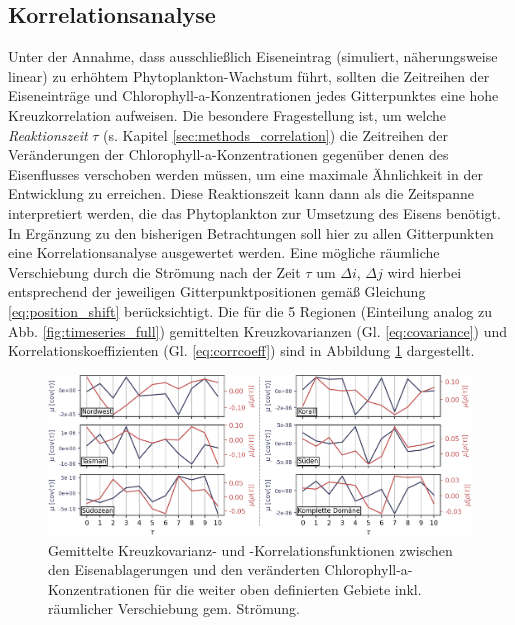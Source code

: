 \documentclass[12pt,a4paper,onecolumn]{scrartcl}
\begin{document}
\subsection{Korrelationsanalyse} \label{sec:correlation_analysis}
Unter der Annahme, dass ausschließlich Eiseneintrag (simuliert, näherungsweise linear) zu erhöhtem Phytoplankton-Wachstum führt, sollten die Zeitreihen der Eiseneinträge und Chlorophyll-a-Konzentrationen jedes Gitterpunktes eine hohe Kreuzkorrelation aufweisen. Die besondere Fragestellung ist, um welche \textit{Reaktionszeit} $\tau$ (s. Kapitel \ref{sec:methods_correlation}) die Zeitreihen der Veränderungen der Chlorophyll-a-Konzentrationen gegenüber denen des Eisenflusses verschoben werden müssen, um eine maximale Ähnlichkeit in der Entwicklung zu erreichen. Diese Reaktionszeit kann dann als die Zeitspanne interpretiert werden, die das Phytoplankton zur Umsetzung des Eisens benötigt. In Ergänzung zu den bisherigen Betrachtungen soll hier zu allen Gitterpunkten eine Korrelationsanalyse ausgewertet werden. Eine mögliche räumliche Verschiebung durch die Strömung nach der Zeit $\tau$ um $\Delta i$, $\Delta j$ wird hierbei entsprechend der jeweiligen Gitterpunktpositionen gemäß Gleichung \ref{eq:position_shift} berücksichtigt. Die für die 5 Regionen (Einteilung analog zu Abb. \ref{fig:timeseries_full}) gemittelten Kreuzkovarianzen (Gl. \ref{eq:covariance}) und Korrelationskoeffizienten (Gl. \ref{eq:corrcoeff}) sind in Abbildung \ref{fig:section_cross_corr} dargestellt.
\begin{figure}[!htb]
\includegraphics[width=\textwidth]{bilder/section_crosscorr_noadv.png}
\caption{Gemittelte Kreuzkovarianz- und -Korrelationsfunktionen zwischen den Eisenablagerungen und den veränderten Chlorophyll-a-Konzentrationen für die weiter oben definierten Gebiete inkl. räumlicher Verschiebung gem. Strömung.} \label{fig:section_cross_corr}
\end{figure}
\end{document}
